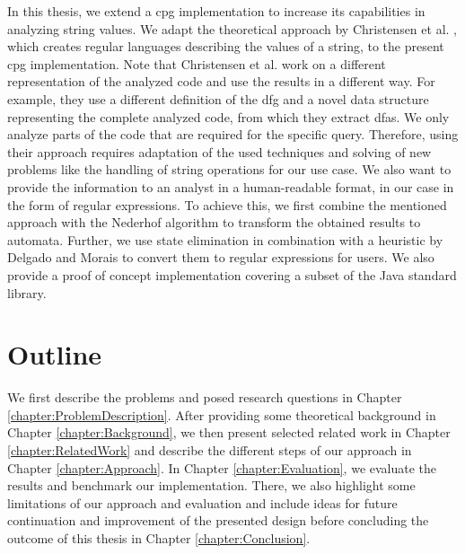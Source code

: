 In this thesis, we extend a \acf{cpg} implementation \cite{cpg} to increase its capabilities in analyzing string values. We adapt the theoretical approach by Christensen et al. \cite{brics}, which creates regular languages describing the values of a string, to the present \ac{cpg} implementation. Note that Christensen et al. work on a different representation of the analyzed code and use the results in a different way. For example, they use a different definition of the \ac{dfg} and a novel data structure representing the complete analyzed code, from which they extract \acp{dfa}. We only analyze parts of the code that are required for the specific query. Therefore, using their approach requires adaptation of the used techniques and solving of new problems like the handling of string operations for our use case. We also want to provide the information to an analyst in a human-readable format, in our case in the form of regular expressions.
To achieve this, we first combine the mentioned approach with the Nederhof algorithm \cite{nederhof} to transform the obtained results to automata. Further, we use state elimination in combination with a heuristic by Delgado and Morais \cite{delgado} to convert them to regular expressions for users. We also provide a proof of concept implementation covering a subset of the Java standard library.

\section{Outline}\label{sec:intro:outline}

We first describe the problems and posed research questions in Chapter \ref{chapter:ProblemDescription}.
After providing some theoretical background in Chapter \ref{chapter:Background}, we then present selected related work in Chapter \ref{chapter:RelatedWork} and describe the different steps of our approach in Chapter \ref{chapter:Approach}.
In Chapter \ref{chapter:Evaluation}, we evaluate the results and benchmark our implementation. There, we also highlight some limitations of our approach and evaluation and include ideas for future continuation and improvement of the presented design before concluding the outcome of this thesis in Chapter \ref{chapter:Conclusion}.
